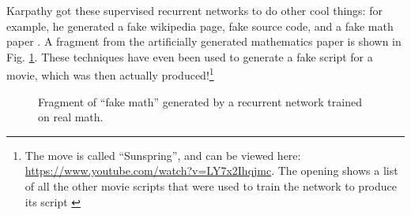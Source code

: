 Karpathy got these supervised recurrent networks to do other cool things:  for example, he generated a fake wikipedia page, fake source code, and a fake math paper \cite{karpathy2015unreasonable}. A fragment from the artificially generated mathematics paper is shown in Fig. \ref{fakeMath}. These techniques have even been used to generate a fake script for a movie, which was then actually produced!\footnote{The move is called ``Sunspring'', and can be viewed here: \url{https://www.youtube.com/watch?v=LY7x2Ihqjmc}. The opening shows a list of all the other movie scripts that were used to train the network to produce its script \cite{newitz2016movie}}

\begin{figure}[h]
\centering
{}
\caption[From Karpathy, 2015 \cite{karpathy2015unreasonable}.]{Fragment of ``fake math'' generated by a recurrent network trained on real math.}
\label{fakeMath}
\end{figure}

